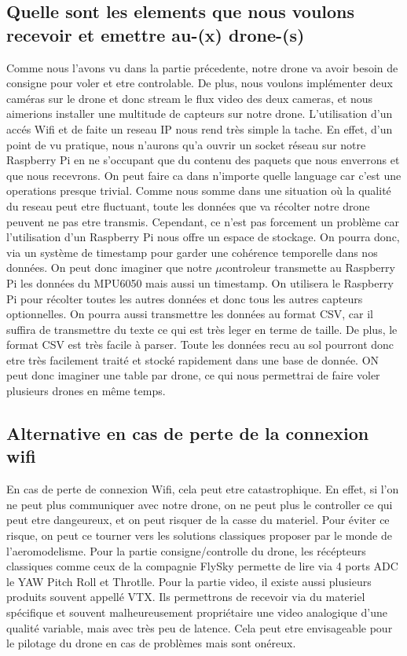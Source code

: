 \documentclass[10pt,a4paper]{article}
\begin{document}
\subsection{Quelle sont les elements que nous voulons recevoir et emettre au-(x) drone-(s)}
Comme nous l'avons vu dans la partie précedente, notre drone va avoir besoin de consigne pour voler et etre controlable. De plus, nous voulons implémenter deux caméras sur le drone et donc stream le flux video des deux cameras, et nous aimerions installer une multitude de capteurs sur notre drone. L'utilisation d'un accés Wifi et de faite un reseau IP nous rend très simple la tache. En effet, d'un point de vu pratique, nous n'aurons qu'a ouvrir un socket réseau sur notre Raspberry Pi en ne s'occupant que du contenu des paquets que nous enverrons et que nous recevrons. On peut faire ca dans n'importe quelle language car c'est une operations presque trivial. 
Comme nous somme dans une situation où la qualité du reseau peut etre fluctuant, toute les données que va récolter notre drone peuvent ne pas etre transmis. Cependant, ce n'est pas forcement un problème car l'utilisation d'un Raspberry Pi nous offre un espace de stockage. On pourra donc, via un système de timestamp pour garder une cohérence temporelle dans nos données. On peut donc imaginer que notre $\mu$controleur transmette au Raspberry Pi les données du MPU6050 mais aussi un timestamp. On utilisera le Raspberry Pi pour récolter toutes les autres données et donc tous les autres capteurs optionnelles. On pourra aussi transmettre les données au format CSV, car il suffira de transmettre du texte ce qui est très leger en terme de taille. De plus, le format CSV est très facile à parser. Toute les données recu au sol pourront donc etre très facilement traité et stocké rapidement dans une base de donnée. ON peut donc imaginer une table par drone, ce qui nous permettrai de faire voler plusieurs drones en même temps.
\subsection{Alternative en cas de perte de la connexion wifi}
En cas de perte de connexion Wifi, cela peut etre catastrophique. En effet, si l'on ne peut plus communiquer avec notre drone, on ne peut plus le controller ce qui peut etre dangeureux, et on peut risquer de la casse du materiel. Pour éviter ce risque, on peut ce tourner vers les solutions classiques proposer par le monde de l'aeromodelisme. Pour la partie consigne/controlle du drone, les récépteurs classiques comme ceux de la compagnie FlySky permette de lire via 4 ports ADC le YAW Pitch Roll et Throtlle. Pour la partie video, il existe aussi plusieurs produits souvent appellé VTX. Ils permettrons de recevoir via du materiel spécifique et souvent malheureusement propriétaire une video analogique d'une qualité variable, mais avec très peu de latence. Cela peut etre envisageable pour le pilotage du drone en cas de problèmes mais sont onéreux. 
\end{document}

